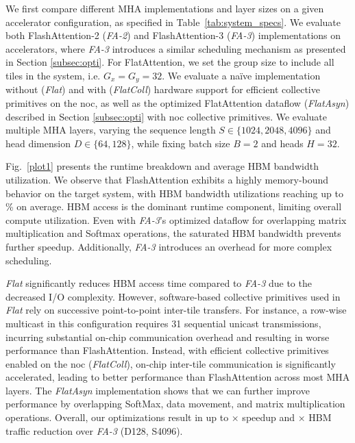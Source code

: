 \documentclass[conference]{IEEEtran}
\begin{document}
We first compare different MHA implementations and layer sizes on a given \arch accelerator configuration, as specified in Table~\ref{tab:system_specs}.
We evaluate both FlashAttention-2 (\textit{FA-2}) and FlashAttention-3 (\textit{FA-3}) implementations on \arch accelerators, where \textit{FA-3} introduces a similar scheduling mechanism as presented in Section \ref{subsec:opti}.
For FlatAttention, we set the group size to include all tiles in the system, i.e. $G_x=G_y=32$.
We evaluate a na\"ive implementation without (\textit{Flat}) and with (\textit{FlatColl}) hardware support for efficient collective primitives on the \gls{noc}, as well as the optimized FlatAttention dataflow (\textit{FlatAsyn}) described in Section \ref{subsec:opti} with \gls{noc} collective primitives. We evaluate multiple MHA layers, varying the sequence length $S \in \{1024, 2048, 4096\}$ and head dimension $D \in \{64, 128\}$, while fixing batch size $B = 2$ and heads $H = 32$.

Fig.~\ref{plot1} presents the runtime breakdown and average HBM bandwidth utilization. We observe that FlashAttention exhibits a highly memory-bound behavior on the target \arch system, with HBM bandwidth utilizations reaching up to \FlashBW\% on average. HBM access is the dominant runtime component, limiting overall compute utilization. Even with \textit{FA-3}’s optimized dataflow for overlapping matrix multiplication and Softmax operations, the saturated HBM bandwidth prevents further speedup. Additionally, \textit{FA-3} introduces an overhead for more complex scheduling.

\textit{Flat} significantly reduces HBM access time compared to \textit{FA-3} due to the decreased I/O complexity.
However, software-based collective primitives used in \textit{Flat} rely on successive point-to-point inter-tile transfers. For instance, a row-wise multicast in this configuration requires 31 sequential unicast transmissions, incurring substantial on-chip communication overhead and resulting in worse performance than FlashAttention.
Instead, with efficient collective primitives enabled on the \gls{noc} (\textit{FlatColl}), on-chip inter-tile communication is significantly accelerated, leading to better performance than FlashAttention across most MHA layers. The \textit{FlatAsyn} implementation shows that we can further improve performance by overlapping SoftMax, data movement, and matrix multiplication operations.
Overall, our optimizations result in up to \OptFlatPerfSU× speedup and \OptFlatHBMTraficSave× HBM traffic reduction over \textit{FA-3} (D128, S4096).
\end{document}
